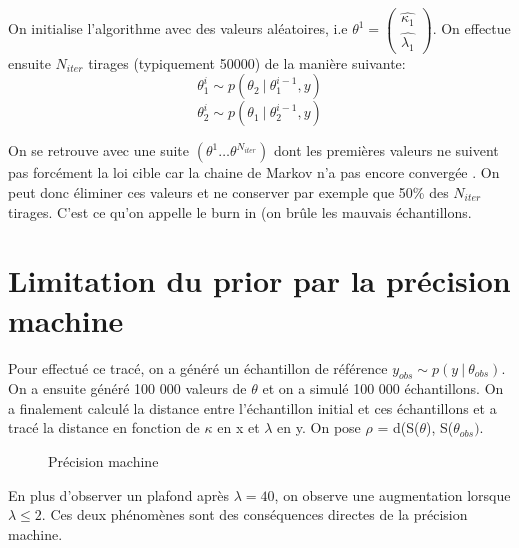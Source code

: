 On initialise l'algorithme avec des valeurs aléatoires, i.e $\theta^1 = \begin{pmatrix} \hat{\kappa_1}\\ \hat{\lambda_1} \end{pmatrix}$. On effectue ensuite $N_{iter}$ tirages (typiquement 50000) de la manière suivante:
\[\theta^i_1 \sim p(\theta_2~|~\theta_1^{i-1}, y)\]\[\theta^i_2 \sim p(\theta_1~|~\theta_2^{i-1}, y)\]

On se retrouve avec une suite $(\theta^1 \dots \theta^{N_{iter}})$ dont les premières valeurs ne suivent pas forcément la loi cible car la chaine de Markov n'a pas encore convergée . On peut donc éliminer ces valeurs et ne conserver par exemple que 50\% des $N_{iter}$ tirages. C'est ce qu'on appelle le burn in (on brûle les mauvais échantillons.
\begin{center}
\end{center}



\chapter{Limitation du prior par la précision machine}
Pour effectué ce tracé, on a généré un échantillon de référence  $y_{obs} \sim p(y~|~\theta_{obs})$. On a ensuite généré 100 000 valeurs de $\theta$ et on a simulé 100 000 échantillons. On a finalement calculé la distance entre l'échantillon initial et ces échantillons et a tracé la distance en fonction de $\kappa$ en x et $\lambda$ en y.
On pose $\rho$ = d(S($\theta$), S($\theta_{obs})$.

\begin{figure}[!h]
\centering
\newcommand{\scale}{0.5}
\caption{Précision machine}
\label{precision}
\end{figure}

En plus d'observer un plafond après $\lambda = 40$, on observe une augmentation lorsque $\lambda \leq 2$. Ces deux phénomènes sont des conséquences directes de la précision machine.


